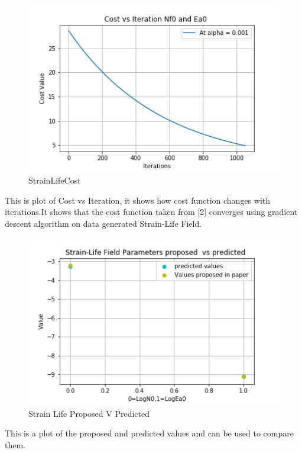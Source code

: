 \documentclass[11pt]{article}
\begin{document}
\begin{figure}
\centering
\includegraphics{images/costviterEa.png}
\caption{StrainLifeCost}
\end{figure}

This is plot of Cost vs Iteration, it shows how cost function changes
with iterations.It shows that the cost function taken from {[}2{]}
converges using gradient descent algorithm on data generated Strain-Life
Field.

\begin{figure}
\centering
\includegraphics{images/StrainLifePropvPred.png}
\caption{Strain Life Proposed V Predicted}
\end{figure}

This is a plot of the proposed and predicted values and can be used to
compare them.
\end{document}
